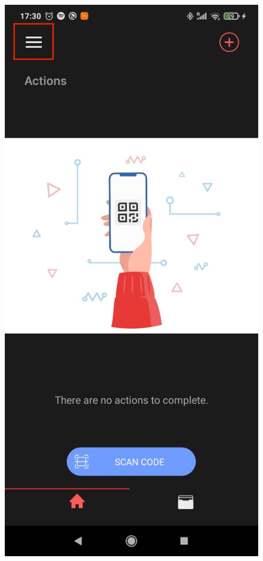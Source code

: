 \begin{figure}[!htb]
  \includegraphics[width=\linewidth]{images/Trinsic/Trinsic_welcome_screen.jpeg}

\end{figure}
